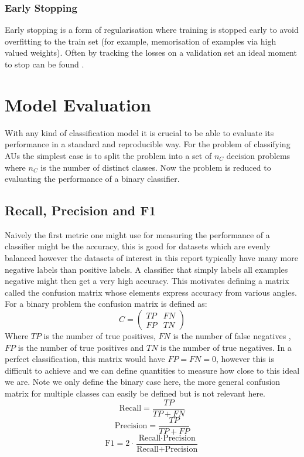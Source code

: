     \subsubsection{Early Stopping}
      Early stopping is a form of regularisation where training is stopped early
      to avoid overfitting to the train set (for example, memorisation of examples via high valued weights).
      Often by tracking the losses on
      a validation set an ideal moment to stop can be found \cite{Prechelt2012a}.
\section{Model Evaluation} \label{sec:eval}
  With any kind of classification model it is crucial to be able to evaluate its
  performance in a standard and reproducible way. For the problem of classifying
  AUs the simplest case is to split the problem into a set of $n_C$ decision problems
  where $n_C$ is the number of distinct classes. Now the problem is reduced to
  evaluating the performance of a binary classifier.

  \subsection{Recall, Precision and F1}
    Naively the first metric one might use for measuring the performance of a classifier
    might be the accuracy, this is good for datasets which are evenly balanced however
    the datasets of interest in this report typically have many more negative labels than positive labels.
    A classifier that simply labels all examples negative might then get a very high accuracy. This motivates
    defining a matrix called the confusion matrix whose elements express accuracy from various angles.
    For a binary problem the confusion matrix is defined as:
    \begin{equation}
      C =
      \begin{pmatrix}
        TP & FN\\
        FP & TN
      \end{pmatrix}
    \end{equation}
    Where $TP$ is the number of true positives, $FN$ is the number of false negatives
    , $FP$ is the number of true positives and $TN$ is the number of true negatives.
    In a perfect classification, this matrix would have $FP=FN=0$, however this is
    difficult to achieve
    and we can define quantities to measure how close to this ideal we are. Note we
    only define the binary case here, the more general confusion matrix for multiple
    classes can easily be defined but is not relevant here.
    \begin{equation}
      \text{Recall} = \frac{TP}{TP+FN}
    \end{equation}
    \begin{equation}
      \text{Precision} = \frac{TP}{TP+FP}
    \end{equation}
    \begin{equation}
      \text{F1} = 2 \cdot \frac{\text{Recall} \cdot \text{Precision}}{\text{Recall} + \text{Precision}}
    \end{equation}


